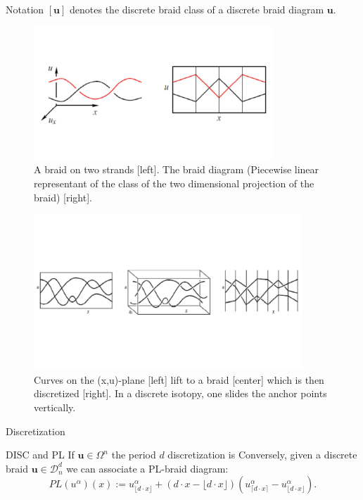\documentclass[9pt, english]{beamer}
\theoremstyle{definition}
\newcommand{\simbolovettore}[1]{{\boldsymbol{#1}}}
\newcommand{\vu}{\simbolovettore{u}}
\begin{document}
\begin{frame}
        \begin{block}{Notation}
            $[\vu]$ denotes the discrete braid class of a discrete braid
            diagram $\vu$.
        \end{block}
       \begin{figure}\label{fig:PLdiagram}
        \includegraphics[width=0.8\textwidth]{images/Fig19Wojcik2.pdf}\caption{A braid on two strands [left]. The braid diagram
        (Piecewise linear representant of the class of the two dimensional projection of the
        braid) [right].}
        \end{figure}
\end{frame}
\begin{frame}
        \begin{figure}\label{fig:fig1Inve}
        \includegraphics[width=0.9\textwidth]{images/Fig1Inventiones2.pdf}\caption{Curves on the (x,u)-plane [left] lift to a braid [center]
        which is then discretized [right]. In a discrete isotopy, one slides the anchor points vertically.}
        \end{figure}
\end{frame}
\begin{frame}{Discretization}
    \begin{block}{DISC and PL}
        If $\vu \in \Omega^n$ the period $d$ discretization is
        \structure{
        \[
        DISC_d(\vu):={u^\alpha(i/d)}_i^\alpha
        \]}\pause
        Conversely, given a discrete braid $\vu\in \mathcal{D}_n^d$ we
        can associate a PL-braid diagram:\pause
        \alert{
        \[
        PL(u^\alpha)(x):=u^\alpha_{\lfloor d\cdot x\rfloor}+ (d\cdot x-\lfloor d\cdot
        x\rfloor)(u^\alpha_{\lceil d\cdot x\rceil}-u^\alpha_{\lfloor d\cdot x\rfloor}).
        \]}
    \end{block}
\end{frame}
\end{document}
